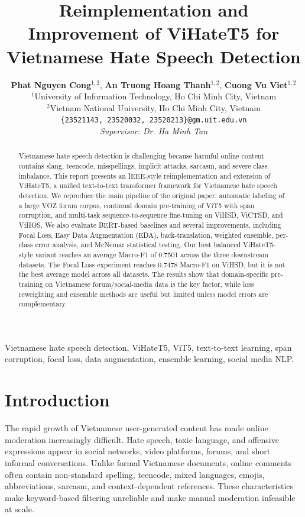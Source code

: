 \documentclass[journal]{IEEEtran}
\title{Reimplementation and Improvement of ViHateT5 for Vietnamese Hate Speech Detection}
\author{
  \textbf{Phat Nguyen Cong}$^{1,2}$, \textbf{An Truong Hoang Thanh}$^{1,2}$, \textbf{Cuong Vu Viet}$^{1,2}$ \\
  \addlinespace[0.2cm]
  $^1$University of Information Technology, Ho Chi Minh City, Vietnam \\
  $^2$Vietnam National University, Ho Chi Minh City, Vietnam \\
  \texttt{\{23521143, 23520032, 23520213\}@gm.uit.edu.vn} \\
  \addlinespace[0.1cm]
  \textit{Supervisor: Dr. Ha Minh Tan}
}
\newcommand{\mf}{Macro-F1}
\begin{document}
\maketitle

\begin{abstract}
Vietnamese hate speech detection is challenging because harmful online content contains slang, teencode, misspellings, implicit attacks, sarcasm, and severe class imbalance. This report presents an IEEE-style reimplementation and extension of ViHateT5, a unified text-to-text transformer framework for Vietnamese hate speech detection. We reproduce the main pipeline of the original paper: automatic labeling of a large VOZ forum corpus, continual domain pre-training of ViT5 with span corruption, and multi-task sequence-to-sequence fine-tuning on ViHSD, ViCTSD, and ViHOS. We also evaluate BERT-based baselines and several improvements, including Focal Loss, Easy Data Augmentation (EDA), back-translation, weighted ensemble, per-class error analysis, and McNemar statistical testing. Our best balanced ViHateT5-style variant reaches an average \mf{} of 0.7501 across the three downstream datasets. The Focal Loss experiment reaches 0.7478 \mf{} on ViHSD, but it is not the best average model across all datasets. The results show that domain-specific pre-training on Vietnamese forum/social-media data is the key factor, while loss reweighting and ensemble methods are useful but limited unless model errors are complementary.
\end{abstract}

\begin{IEEEkeywords}
Vietnamese hate speech detection, ViHateT5, ViT5, text-to-text learning, span corruption, focal loss, data augmentation, ensemble learning, social media NLP.
\end{IEEEkeywords}

\section{Introduction}
The rapid growth of Vietnamese user-generated content has made online moderation increasingly difficult. Hate speech, toxic language, and offensive expressions appear in social networks, video platforms, forums, and short informal conversations. Unlike formal Vietnamese documents, online comments often contain non-standard spelling, teencode, mixed languages, emojis, abbreviations, sarcasm, and context-dependent references. These characteristics make keyword-based filtering unreliable and make manual moderation infeasible at scale.
\end{document}
